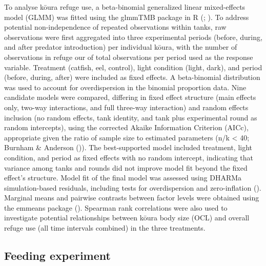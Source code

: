 \documentclass[
  letterpaper,
  DIV=11,
  numbers=noendperiod]{scrartcl}
\begin{document}
To analyse kōura refuge use, a beta-binomial generalized linear
mixed-effects model (GLMM) was fitted using the glmmTMB package in R
(;
). To address potential
non-independence of repeated observations within tanks, raw observations
were first aggregated into three experimental periods (before, during,
and after predator introduction) per individual kōura, with the number
of observations in refuge our of total observations per period used as
the response variable. Treatment (catfish, eel, control), light
condition (light, dark), and period (before, during, after) were
included as fixed effects. A beta-binomial distribution was used to
account for overdispersion in the binomial proportion data. Nine
candidate models were compared, differing in fixed effect structure
(main effects only, two-way interactions, and full three-way
interaction) and random effects inclusion (no random effects, tank
identity, and tank plus experimental round as random intercepts), using
the corrected Akaike Information Criterion (AICc), appropriate given the
ratio of sample size to estimated parameters (n/k \textless{} 40;
Burnham \& Anderson ()). The
best-supported model included treatment, light condition, and period as
fixed effects with no random intercept, indicating that variance among
tanks and rounds did not improve model fit beyond the fixed effect's
structure. Model fit of the final model was assessed using DHARMa
simulation-based residuals, including tests for overdispersion and
zero-inflation ().
Marginal means and pairwise contrasts between factor levels were
obtained using the emmeans package (). Spearman rank correlations were also used to investigate
potential relationships between kōura body size (OCL) and overall refuge
use (all time intervals combined) in the three treatments.

\subsection{Feeding experiment}\label{feeding-experiment}
\end{document}
